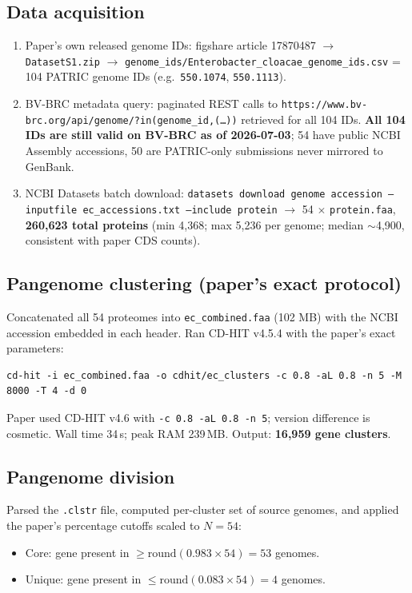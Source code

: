 \documentclass[11pt,a4paper]{article}
\begin{document}
\subsection{Data acquisition}
\begin{enumerate}
  \item Paper's own released genome IDs: figshare article 17870487 $\rightarrow$ \texttt{DatasetS1.zip} $\rightarrow$ \texttt{genome\_ids/Enterobacter\_cloacae\_genome\_ids.csv} = 104 PATRIC genome IDs (e.g.\ \texttt{550.1074}, \texttt{550.1113}).
  \item BV-BRC metadata query: paginated REST calls to \texttt{https://www.bv-brc.org/api/genome/?in(genome\_id,(\ldots))} retrieved for all 104 IDs. \textbf{All 104 IDs are still valid on BV-BRC as of 2026-07-03}; 54 have public NCBI Assembly accessions, 50 are PATRIC-only submissions never mirrored to GenBank.
  \item NCBI Datasets batch download: \texttt{datasets download genome accession --inputfile ec\_accessions.txt --include protein} $\rightarrow$ 54 $\times$ \texttt{protein.faa}, \textbf{260{,}623 total proteins} (min 4{,}368; max 5{,}236 per genome; median $\sim$4{,}900, consistent with paper CDS counts).
\end{enumerate}

\subsection{Pangenome clustering (paper's exact protocol)}
Concatenated all 54 proteomes into \texttt{ec\_combined.faa} (102 MB) with the NCBI accession embedded in each header. Ran CD-HIT v4.5.4 with the paper's exact parameters:
\begin{lstlisting}
cd-hit -i ec_combined.faa -o cdhit/ec_clusters -c 0.8 -aL 0.8 -n 5 -M 8000 -T 4 -d 0
\end{lstlisting}
Paper used CD-HIT v4.6 with \texttt{-c 0.8 -aL 0.8 -n 5}; version difference is cosmetic. Wall time 34\,s; peak RAM 239\,MB. Output: \textbf{16{,}959 gene clusters}.

\subsection{Pangenome division}
Parsed the \texttt{.clstr} file, computed per-cluster set of source genomes, and applied the paper's percentage cutoffs scaled to $N=54$:
\begin{itemize}
  \item Core: gene present in $\geq \mathrm{round}(0.983 \times 54) = 53$ genomes.
  \item Unique: gene present in $\leq \mathrm{round}(0.083 \times 54) = 4$ genomes.
\end{itemize}
\end{document}
